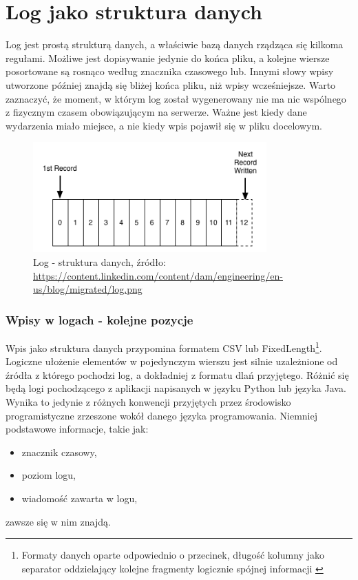 \section{Log jako struktura danych}
\label{chapter:logs:structure}
    Log jest prostą strukturą danych, a właściwie bazą danych rządząca się kilkoma regułami.
    Możliwe jest dopisywanie jedynie do końca pliku, a kolejne wiersze posortowane są rosnąco
    według znacznika czasowego lub. Innymi słowy wpisy utworzone później znajdą się bliżej końca pliku,
    niż wpisy wcześniejsze. Warto zaznaczyć, że moment, w którym log został wygenerowany nie ma
    nic wspólnego z fizycznym czasem obowiązującym na serwerze. Ważne jest kiedy dane wydarzenia
    miało miejsce, a nie kiedy wpis pojawił się w pliku docelowym.
    
     \begin{figure}[H]
         \centering
         \includegraphics[width=0.80\textwidth]{images/log_file_structure}
         \caption[Log jako struktura danych]{
             Log - struktura danych, źródło: \url{https://content.linkedin.com/content/dam/engineering/en-us/blog/migrated/log.png}
            }
            \label{chapter:logs:history:log_file_as_data_structure_picture}
    \end{figure}

    \subsubsection{Wpisy w logach - kolejne pozycje}
    \label{chapter:logs:structure:record_structure}
    Wpis jako struktura danych przypomina formatem CSV lub FixedLength\footnote{Formaty danych oparte odpowiednio o przecinek, długość kolumny 
        jako separator oddzielający kolejne fragmenty logicznie spójnej informacji \cite{csv_definition}}. 
    Logiczne ułożenie elementów w pojedynczym wierszu jest silnie uzależnione od źródła z którego pochodzi log, 
    a dokładniej z formatu dlań przyjętego. Różnić się będą logi pochodzącego z aplikacji napisanych w języku Python
    lub języka Java. Wynika to jedynie z różnych konwencji przyjętych przez środowisko 
    programistyczne zrzeszone wokół danego języka programowania. Niemniej podstawowe informacje, takie jak:
    \begin{itemize}
        \item znacznik czasowy,
        \item poziom logu,
        \item wiadomość zawarta w logu,
    \end{itemize}
    zawsze się w nim znajdą. 
    

